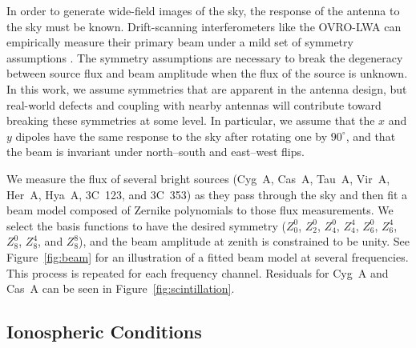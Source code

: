 \begin{bibunit}
In order to generate wide-field images of the sky, the response of the antenna to the sky must be
known. Drift-scanning interferometers like the OVRO-LWA can empirically measure their primary beam
under a mild set of symmetry assumptions \citep{2012AJ....143...53P}. The symmetry assumptions are
necessary to break the degeneracy between source flux and beam amplitude when the flux of the source
is unknown. In this work, we assume symmetries that are apparent in the antenna design, but
real-world defects and coupling with nearby antennas will contribute toward breaking these
symmetries at some level. In particular, we assume that the $x$ and $y$ dipoles have the same
response to the sky after rotating one by $90^\circ$, and that the beam is invariant under
north--south and east--west flips.

We measure the flux of several bright sources (Cyg~A, Cas~A, Tau~A, Vir~A, Her~A, Hya~A, 3C~123, and
3C~353) as they pass through the sky and then fit a beam model composed of Zernike polynomials to
those flux measurements. We select the basis functions to have the desired symmetry ($Z_0^0$,
$Z_2^0$, $Z_4^0$, $Z_4^4$, $Z_6^0$, $Z_6^4$, $Z_8^0$, $Z_8^4$, and $Z_8^8$), and the beam amplitude
at zenith is constrained to be unity. See Figure~\ref{fig:beam} for an illustration of a fitted beam
model at several frequencies. This process is repeated for each frequency channel. Residuals for
Cyg~A and Cas~A can be seen in Figure~\ref{fig:scintillation}.

\subsection{Ionospheric Conditions}\label{sec:ionosphere-conditions}


\end{bibunit}
